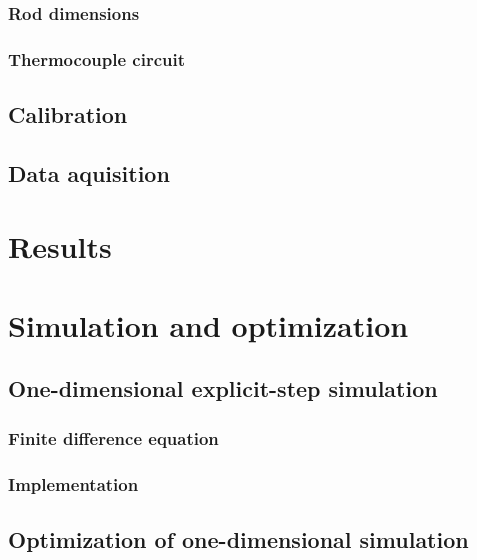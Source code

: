 \documentclass[letterpaper,titlepage,oneside]{report}
\begin{document}
\subsection{Rod dimensions}

\subsection{Thermocouple circuit}

\section{Calibration}

\section{Data aquisition}

\chapter{Results}
\label{ch:results}

\chapter{Simulation and optimization}
\label{ch:simulation}

\section{One-dimensional explicit-step simulation}

\subsection{Finite difference equation}

\subsection{Implementation}

\section{Optimization of one-dimensional simulation}
\end{document}
